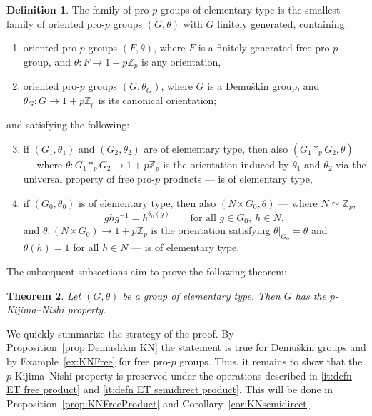 \documentclass{amsart}
\newtheorem{thm}{Theorem}[section]
\theoremstyle{definition}
\newtheorem{defn}[thm]{Definition}
\theoremstyle{remark}
\newcommand{\ZZ}{\mathbb{Z}}
\newcommand{\Z}{\ZZ}
\begin{document}
\begin{defn}\label{defn:ET}\rm
 The family of pro-$p$ groups of elementary type is the smallest family of oriented pro-$p$ groups $(G,\theta)$ with $G$ finitely generated, containing:
 \begin{enumerate}[label=(\alph*)]
  \item oriented pro-$p$ groups $(F,\theta)$, where $F$ is a finitely generated free pro-$p$ group, and $\theta\colon F\to1+p\Z_p$ is any orientation,
  \item oriented pro-$p$ groups $(G,\theta_G)$, where $G$ is a Demu\v{s}kin group, and $\theta_G\colon G\to1+p\Z_p$ is its canonical orientation;
 \end{enumerate}
and satisfying the following:
\begin{enumerate}[label=(\alph*)]
\setcounter{enumi}{2}
 \item \label{it:defn ET free product} if $(G_1,\theta_1)$ and $(G_2,\theta_2)$ are of elementary type, then also $(G_1\ast_p G_2,\theta)$ --- where $\theta\colon G_1\ast_p G_2\to1+p\Z_p$ is the orientation induced by $\theta_1$ and $\theta_2$ via the universal property of free pro-$p$ products --- is of elementary type,
 \item \label{it:defn ET semidirect product} if $(G_0,\theta_0)$ is of elementary type, then also $(N\rtimes G_0,\theta)$ --- where $N\simeq\Z_p$,
 $$ghg^{-1}=h^{\theta_0(g)}\qquad\text{for all }g\in G_0,\:h\in N,$$
 and $\theta\colon (N\rtimes G_0)\to1+p\Z_p$ is the orientation satisfying $\theta\vert_{G_0}=\theta$ and $\theta(h)=1$ for all $h\in N$ --- is of elementary type.
\end{enumerate}
\end{defn}
The subsequent subsections aim to prove the following theorem:
\begin{thm}
\label{thm:ETC}
    Let $(G,\theta)$ be a group of elementary type. Then $G$ has the $p$-Kijima--Nishi property.
\end{thm}
We quickly summarize the strategy of the proof. By Proposition~\ref{prop:Demushkin KN} the statement is true for Demu\v{s}kin groups and by Example~\ref{ex:KNFree} for free pro-$p$ groups. Thus, it remains to show that the $p$-Kijima--Nishi property is preserved under the operations described in \ref{it:defn ET free product} and \ref{it:defn ET semidirect product}. This will be done in Proposition~\ref{prop:KNFreeProduct} and Corollary~\ref{cor:KNsemidirect}.
\end{document}
